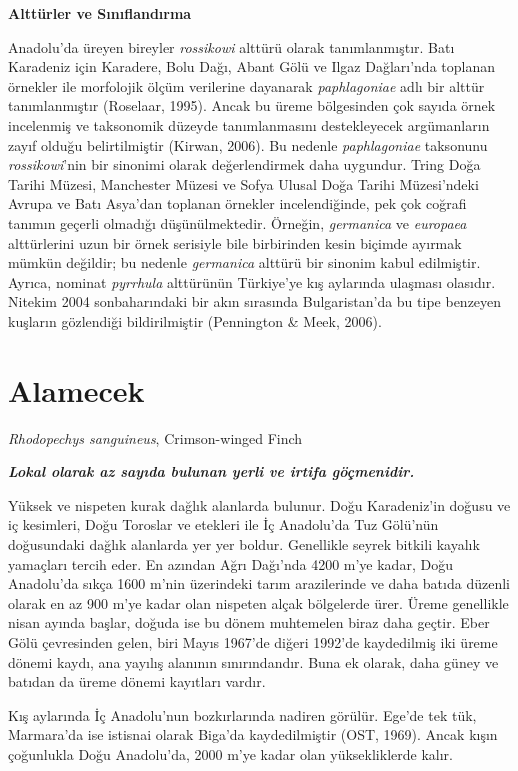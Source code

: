 \documentclass[
  10.5pt,
  a4paper,
  DIV=11,
  numbers=noendperiod,
  twocolumn]{scrreprt}
\begin{document}
\textbf{Alttürler ve Sınıflandırma}

Anadolu'da üreyen bireyler \emph{rossikowi} alttürü olarak
tanımlanmıştır. Batı Karadeniz için Karadere, Bolu Dağı, Abant Gölü ve
Ilgaz Dağları'nda toplanan örnekler ile morfolojik ölçüm verilerine
dayanarak \emph{paphlagoniae} adlı bir alttür tanımlanmıştır (Roselaar,
1995). Ancak bu üreme bölgesinden çok sayıda örnek incelenmiş ve
taksonomik düzeyde tanımlanmasını destekleyecek argümanların zayıf
olduğu belirtilmiştir (Kirwan, 2006). Bu nedenle \emph{paphlagoniae}
taksonunu \emph{rossikowi}'nin bir sinonimi olarak değerlendirmek daha
uygundur. Tring Doğa Tarihi Müzesi, Manchester Müzesi ve Sofya Ulusal
Doğa Tarihi Müzesi'ndeki Avrupa ve Batı Asya'dan toplanan örnekler
incelendiğinde, pek çok coğrafi tanımın geçerli olmadığı
düşünülmektedir. Örneğin, \emph{germanica} ve \emph{europaea}
alttürlerini uzun bir örnek serisiyle bile birbirinden kesin biçimde
ayırmak mümkün değildir; bu nedenle \emph{germanica} alttürü bir sinonim
kabul edilmiştir. Ayrıca, nominat \emph{pyrrhula} alttürünün Türkiye'ye
kış aylarında ulaşması olasıdır. Nitekim 2004 sonbaharındaki bir akın
sırasında Bulgaristan'da bu tipe benzeyen kuşların gözlendiği
bildirilmiştir (Pennington \& Meek, 2006).

\section{Alamecek}\label{alamecek}

\emph{Rhodopechys sanguineus}, Crimson-winged Finch

\textbf{\emph{Lokal olarak az sayıda bulunan yerli ve irtifa
göçmenidir.}}

Yüksek ve nispeten kurak dağlık alanlarda bulunur. Doğu Karadeniz'in
doğusu ve iç kesimleri, Doğu Toroslar ve etekleri ile İç Anadolu'da Tuz
Gölü'nün doğusundaki dağlık alanlarda yer yer boldur. Genellikle seyrek
bitkili kayalık yamaçları tercih eder. En azından Ağrı Dağı'nda 4200
m'ye kadar, Doğu Anadolu'da sıkça 1600 m'nin üzerindeki tarım
arazilerinde ve daha batıda düzenli olarak en az 900 m'ye kadar olan
nispeten alçak bölgelerde ürer. Üreme genellikle nisan ayında başlar,
doğuda ise bu dönem muhtemelen biraz daha geçtir. Eber Gölü çevresinden
gelen, biri Mayıs 1967'de diğeri 1992'de kaydedilmiş iki üreme dönemi
kaydı, ana yayılış alanının sınırındandır. Buna ek olarak, daha güney ve
batıdan da üreme dönemi kayıtları vardır.

Kış aylarında İç Anadolu'nun bozkırlarında nadiren görülür. Ege'de tek
tük, Marmara'da ise istisnai olarak Biga'da kaydedilmiştir (OST, 1969).
Ancak kışın çoğunlukla Doğu Anadolu'da, 2000 m'ye kadar olan
yüksekliklerde kalır.
\end{document}
